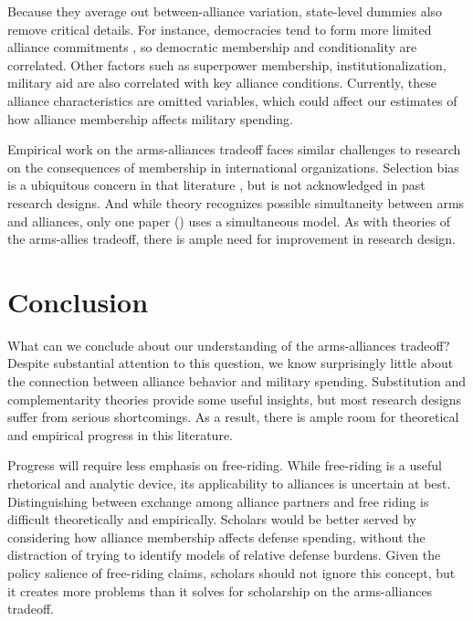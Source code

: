 \documentclass[12pt]{article}
\begin{document}
Because they average out between-alliance variation, state-level dummies also remove critical details. For instance, democracies tend to form more limited alliance commitments \citep{Chibaetal2015}, so democratic membership and conditionality are correlated. Other factors such as superpower membership, institutionalization, military aid are also correlated with key alliance conditions. Currently, these alliance characteristics are omitted variables, which could affect our estimates of how alliance membership affects military spending. 

Empirical work on the arms-alliances tradeoff faces similar challenges to research on the consequences of membership in international organizations. Selection bias is a ubiquitous concern in that literature \citep{Chaudoinetal2016}, but is not acknowledged in past research designs. And while theory recognizes possible simultaneity between arms and alliances, only one paper (\citep{DigiuseppePoast2016}) uses a simultaneous model. As with theories of the arms-allies tradeoff, there is ample need for improvement in research design.






\section*{Conclusion}

What can we conclude about our understanding of the arms-alliances tradeoff? Despite substantial attention to this question, we know surprisingly little about the connection between alliance behavior and military spending. Substitution and complementarity theories provide some useful insights, but most research designs suffer from serious shortcomings. As a result, there is ample room for theoretical and empirical progress in this literature. 

Progress will require less emphasis on free-riding. While free-riding is a useful rhetorical and analytic device, its applicability to alliances is uncertain at best. Distinguishing between exchange among alliance partners and free riding is difficult theoretically and empirically. Scholars would be better served by considering how alliance membership affects defense spending, without the distraction of trying to identify models of relative defense burdens. Given the policy salience of free-riding claims, scholars should not ignore this concept, but it creates more problems than it solves for scholarship on the arms-alliances tradeoff. 
\end{document}
